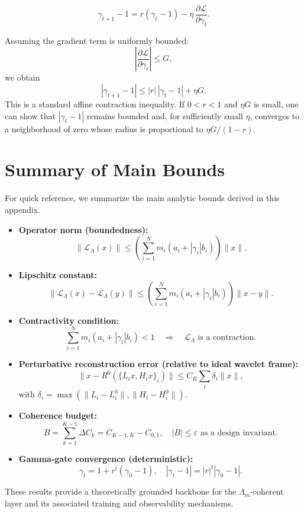 \documentclass[11pt]{article}
\begin{document}
\[
  \gamma_{t+1} - 1
  = r(\gamma_t - 1) - \eta\,\frac{\partial \mathcal{L}}{\partial \gamma_t}.
\]

Assuming the gradient term is uniformly bounded:
\[
  \left|\frac{\partial \mathcal{L}}{\partial \gamma_t}\right| \le G,
\]
we obtain
\begin{equation}
  |\gamma_{t+1} - 1|
  \le |r|\,|\gamma_t - 1| + \eta G.
\end{equation}
This is a standard affine contraction inequality. If $0<r<1$ and $\eta G$ is small, one can show that $|\gamma_t - 1|$ remains bounded and, for sufficiently small $\eta$, converges to a neighborhood of zero whose radius is proportional to $\eta G/(1-r)$.

\section{Summary of Main Bounds}

For quick reference, we summarize the main analytic bounds derived in this appendix.

\begin{itemize}
  \item \textbf{Operator norm (boundedness):}
    \[
      \|\mathcal{L}_\Lambda(x)\|
      \le \left(\sum_{i=1}^N m_i(a_i + |\gamma_i|b_i)\right)\|x\|.
    \]

  \item \textbf{Lipschitz constant:}
    \[
      \|\mathcal{L}_\Lambda(x)-\mathcal{L}_\Lambda(y)\|
      \le \left(\sum_{i=1}^N m_i(a_i + |\gamma_i|b_i)\right)\|x-y\|.
    \]

  \item \textbf{Contractivity condition:}
    \[
      \sum_{i=1}^N m_i(a_i + |\gamma_i|b_i) < 1
      \quad\Rightarrow\quad
      \mathcal{L}_\Lambda\text{ is a contraction.}
    \]

  \item \textbf{Perturbative reconstruction error (relative to ideal wavelet frame):}
    \[
      \|x - R^0(\{L_i x, H_i x\}_i)\|
      \le C_R \sum_i \delta_i \|x\|,
    \]
    with $\delta_i = \max(\|L_i - L_i^0\|,\|H_i - H_i^0\|)$.

  \item \textbf{Coherence budget:}
    \[
      B = \sum_{k=1}^{K-1} \Delta C_k = C_{K-1,K} - C_{0,1},\quad
      |B|\le\varepsilon
      \text{ as a design invariant.}
    \]

  \item \textbf{Gamma-gate convergence (deterministic):}
    \[
      \gamma_t = 1 + r^t(\gamma_0 - 1),\quad |\gamma_t - 1| = |r|^t|\gamma_0-1|.
    \]
\end{itemize}

These results provide a theoretically grounded backbone for the $\Lambda_m$-coherent layer and its associated training and observability mechanisms.

\nocite{*}
  
  
\end{document}
